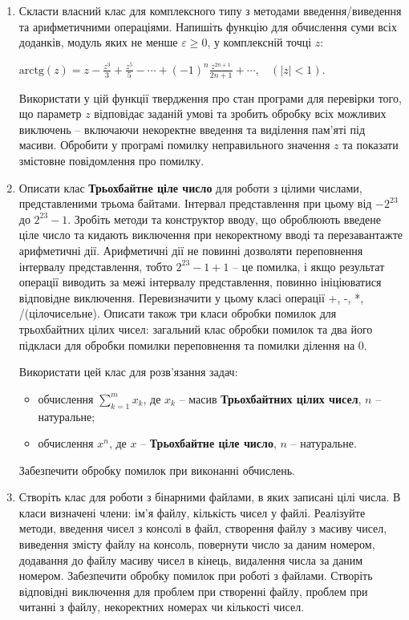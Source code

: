 \documentclass[a5paper,titlepage,openany,twoside,
]
{book_unv}%
\begin{document}
\begin{enumerate}
\begin{enumerate}
\begin{enumerate}
\item
Скласти власний клас для комплексного типу з методами введення/виведення 
та арифметичними операціями. Напишіть функцію для обчислення суми всіх доданків, модуль
яких не менше $\varepsilon \ge 0$, у комплексній точці $z$:

\(\text{arctg}\left( z \right) = z - \frac{z^{3}}{3} + \frac{z^{5}}{5} - \cdots + {(-1)}^{n}\frac{z^{2n+1}}{2n + 1} + \cdots,\ \ \ \ (\left| z \right| < 1)\).

Використати у цій функції твердження про стан програми для перевірки
того, що параметр $z$ відповідає заданій умові та зробить обробку
всіх можливих виключень -- включаючи некоректне введення та виділення
пам'яті під масиви. Обробити у програмі помилку неправильного значення
$z$ та показати змістовне повідомлення про помилку.

\item
Описати клас \textbf{Трьохбайтне ціле число} для роботи з цілими числами,
представленими трьома байтами. Інтервал представлення при цьому від
$-2^{23}$ до $2^{23}-1$. 
Зробіть методи та конструктор вводу, що оброблюють введене ціле число
та кидають виключення при некоректному вводі та перезавантажте арифметичні дії. 
Арифметичні дії не повинні дозволяти переповнення інтервалу представлення, 
тобто $2^{23}-1 + 1$ -- це помилка, і якщо результат операції виводить
 за межі інтервалу представлення, повинно
ініціюватися відповідне виключення. 
Перевизначити у цьому класі операції +, -, *, /(цілочисельне).
Описати також три класи обробки помилок для трьохбайтних цілих чисел:
загальний клас обробки помилок та два його підкласи для обробки помилки
переповнення та помилки ділення на 0.

Використати цей клас для розв'язання задач:
\begin{itemize}
\item
обчислення $\sum\limits_{k=1}^{m} x_{k}$, де $x_k$ -- масив \textbf{Трьохбайтних цілих чисел}, $n$ -- натуральне;
\item
обчислення $x^{n} $, де $x$ -- \textbf{Трьохбайтне ціле число}, $n$ -- натуральне.
\end{itemize}
Забезпечити обробку помилок при виконанні обчислень.


\item
Створіть клас для роботи з бінарними файлами, в яких записані цілі числа.
В класи визначені члени: ім'я файлу, кількість чисел у файлі.
Реалізуйте методи, введення чисел з консолі в файл, створення файлу з масиву чисел,
виведення змісту файлу на консоль, повернути число за даним номером, 
додавання до файлу масиву чисел в кінець, видалення числа за даним номером.
Забезпечити обробку помилок при роботі з файлами. 
Створіть відповідні виключення для проблем при створенні файлу,
проблем при читанні з файлу, некоректних номерах чи кількості чисел. 


\end{enumerate}
\end{enumerate}
\end{enumerate}
\end{document}
